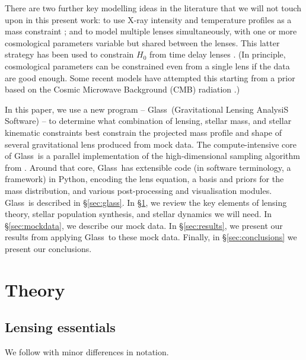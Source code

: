 \documentclass[galley,usenatbib]{mn2e}
\newcommand{\Glass}{{\sc Glass}}
\newcommand{\secref}[1] {\S\ref{#1}}
\begin{document}
There are two further key modelling ideas in the literature that we will not touch upon in this present work: to use
X-ray intensity and temperature profiles as a mass constraint
\citep[e.g.][]{2013ApJ...765...25N}; and to model
multiple lenses simultaneously, with one or more cosmological
parameters variable but shared between the lenses. This latter strategy has
been used to constrain $H_0$ from time delay lenses 
\citep{2006ApJ...652L...5S,2008ApJ...679...17C,2010ApJ...712.1378P}.
(In principle, cosmological parameters can be constrained even from a
single lens if the data are good enough. Some recent models have attempted this starting from a prior
based on the Cosmic Microwave Background (CMB) radiation \citep{2010Sci...329..924J,2013arXiv1306.4732S}.)

In this paper, we use a new program -- \Glass\ (Gravitational Lensing AnalysiS Software) -- to determine what
combination of lensing, stellar mass, and stellar kinematic
constraints best constrain the projected mass profile and shape of several
gravitational lens produced from mock data.  The compute-intensive core of \Glass\ is a
parallel implementation of the high-dimensional sampling algorithm
from \cite{2012MNRAS.425.3077L}.  Around that core, \Glass\ has
extensible code (in software terminology, a framework) in Python,
encoding the lens equation, a basis and priors for the mass
distribution, and various post-processing and visualisation modules.  \Glass\
is described in \secref{sec:glass}.  In \secref{sec:theory}, we
review the key elements of lensing theory, stellar population synthesis, and
stellar dynamics we will need. In \secref{sec:mockdata}, we describe our mock data. In \secref{sec:results}, we present our results from applying \Glass\ to these mock data. Finally, in \S\ref{sec:conclusions} we present our conclusions. 

\section{Theory}\label{sec:theory}

\subsection{Lensing essentials}\label{sec:lensing_basic}

We follow \cite{1986ApJ...310..568B} with minor differences in notation.
\end{document}
